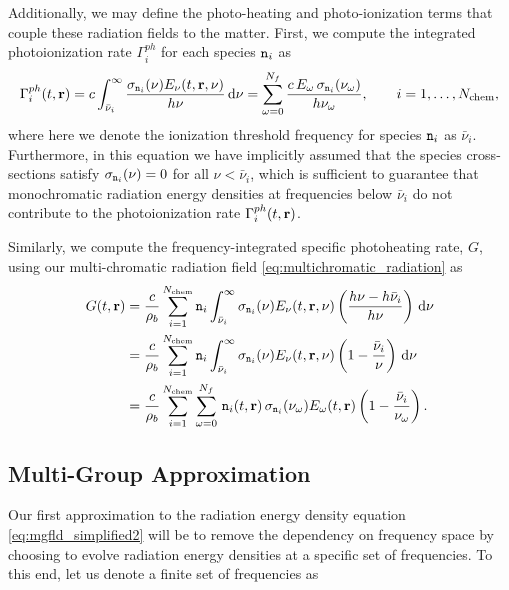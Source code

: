 \documentclass[10pt]{article}
\renewcommand{\(}{\left(}
\renewcommand{\)}{\right)}
\newcommand{\rvec}{{\bf r}}
\newcommand{\rhob}{\rho_b}
\newcommand{\Enu}{E_{\nu}}
\newcommand{\mn}{{\tt n}}
\begin{document}
Additionally, we may define the photo-heating and photo-ionization
terms that couple these radiation fields to the matter.  
First, we compute the integrated photoionization rate $\Gamma_i^{ph}$
for each species $\mn_i$ as
\begin{equation}
\label{eq:multichromatic_photoionization}
   \Gamma_i^{ph}(t,\rvec)  = 
   c \int_{\bar{\nu}_i}^{\infty} \frac{\sigma_{\mn_i}(\nu)\Enu(t,\rvec,\nu)}{h\nu}\,\mathrm d\nu =  
   \sum_{\omega=0}^{N_f} \frac{c\, E_{\omega}\, \sigma_{\mn_i}(\nu_{\omega})}{h\nu_{\omega}}, \qquad i=1,\ldots,N_\text{chem},
\end{equation}
where here we denote the ionization threshold frequency for species
$\mn_i$ as $\bar{\nu}_i$.  Furthermore, in this equation we have
implicitly assumed that the species cross-sections satisfy
$\sigma_{\mn_i}(\nu) = 0$ for all $\nu < \bar{\nu}_i$, which is
sufficient to guarantee that monochromatic radiation energy densities
at frequencies below $\bar{\nu}_i$ do not contribute to the
photoionization rate $\Gamma_i^{ph}(t,\rvec)$. 

Similarly, we compute the frequency-integrated specific photoheating
rate, $G$, using our multi-chromatic radiation field
\eqref{eq:multichromatic_radiation} as 
\begin{align}
\notag
   G(t,\rvec) &= 
   \frac{c}{\rhob} \sum_{i=1}^{N_\text{chem}} \mn_i
     \int_{\bar{\nu}_i}^{\infty} \sigma_{\mn_i}(\nu) \Enu(t,\rvec,\nu)
     \left(\frac{h\nu - h\bar{\nu}_i}{h\nu}\right)\,\mathrm d\nu \\
\label{eq:multichromatic_photoheating}
   &= 
   \frac{c}{\rhob} \sum_{i=1}^{N_\text{chem}} \mn_i
     \int_{\bar{\nu}_i}^{\infty} \sigma_{\mn_i}(\nu) \Enu(t,\rvec,\nu)
     \left(1 - \frac{\bar{\nu}_i}{\nu}\right)\,\mathrm d\nu \\
\notag
   &= 
   \frac{c}{\rhob} \sum_{i=1}^{N_\text{chem}} \sum_{\omega=0}^{N_f}\, \mn_i(t,\rvec)\,
     \sigma_{\mn_i}(\nu_{\omega}) E_{\omega}(t,\rvec) \left(1 - \frac{\bar{\nu}_i}{\nu_{\omega}}\right).
\end{align}




\subsection{Multi-Group Approximation}
\label{subsec:multi_group}

Our first approximation to the radiation energy density equation
\eqref{eq:mgfld_simplified2} will be to remove the dependency on
frequency space by choosing to evolve radiation energy densities at a
specific set of frequencies.  To this end, let us denote a finite set
of frequencies as
\end{document}
